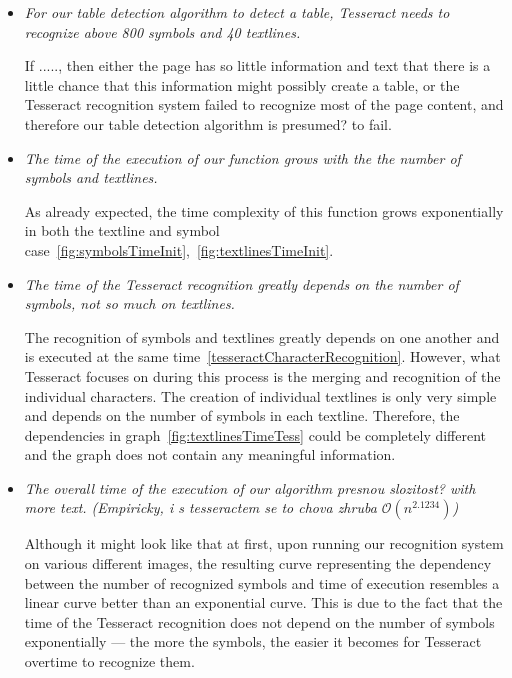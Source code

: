 \begin{itemize}
    \item \emph{For our table detection algorithm to detect a table, Tesseract needs to recognize above 800 symbols and 40 textlines.}
    
     If ....., then either the page has so little information and text that there is a little chance that this information might possibly create a table, or the Tesseract recognition system failed to recognize most of the page content, and therefore our table detection algorithm is  presumed? to fail.

    \item \emph{The time of the execution of our  function grows with the the number of symbols and textlines.}
    
    As already expected, the time complexity of this function grows exponentially in both the textline and symbol case~\cref{fig:symbolsTimeInit},~\cref{fig:textlinesTimeInit}.

    \item \emph{The time of the Tesseract recognition greatly depends on the number of symbols, not so much on textlines.}
    
    The recognition of symbols and textlines greatly depends on one another and is executed at the same time~\cref{tesseractCharacterRecognition}. However, what Tesseract focuses on during this process is the merging and recognition of the individual characters. The creation of individual textlines is only very simple and depends on the number of symbols in each textline. Therefore, the dependencies in graph~\cref{fig:textlinesTimeTess} could be completely different and the graph does not contain any meaningful information.
    
    \item \emph{The overall time of the execution of our algorithm  presnou slozitost? with more text. (Empiricky, i s tesseractem se to chova zhruba $\mathcal{O}(n^{2.1234})$)}
    
    Although it might look like that at first, upon running our recognition system on various different images, the resulting curve representing the dependency between the number of recognized symbols and time of execution resembles a linear curve better than an exponential curve. This is due to the fact that the time of the Tesseract recognition does not depend on the number of symbols exponentially --- the more the symbols, the easier it becomes for Tesseract overtime to recognize them.
    
\end{itemize}

